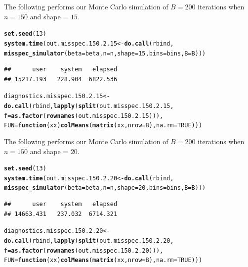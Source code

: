 \documentclass[11pt]{article}\usepackage[]{graphicx}\usepackage[]{color}
\makeatletter
\newcommand{\hlnum}[1]{\textcolor[rgb]{0.686,0.059,0.569}{#1}}%
\newcommand{\hlstd}[1]{\textcolor[rgb]{0.345,0.345,0.345}{#1}}%
\newcommand{\hlkwa}[1]{\textcolor[rgb]{0.161,0.373,0.58}{\textbf{#1}}}%
\newcommand{\hlkwb}[1]{\textcolor[rgb]{0.69,0.353,0.396}{#1}}%
\newcommand{\hlkwc}[1]{\textcolor[rgb]{0.333,0.667,0.333}{#1}}%
\newcommand{\hlkwd}[1]{\textcolor[rgb]{0.737,0.353,0.396}{\textbf{#1}}}%
\newenvironment{kframe}{%
 \def\at@end@of@kframe{}%
 \ifinner\ifhmode%
  \def\at@end@of@kframe{\end{minipage}}%
  \begin{minipage}{\columnwidth}%
 \fi\fi%
 \def\FrameCommand##1{\hskip\@totalleftmargin \hskip-\fboxsep
 \colorbox{shadecolor}{##1}\hskip-\fboxsep
     \hskip-\linewidth \hskip-\@totalleftmargin \hskip\columnwidth}%
 \MakeFramed {\advance\hsize-\width
   \@totalleftmargin\z@ \linewidth\hsize
   \@setminipage}}%
 {\par\unskip\endMakeFramed%
 \at@end@of@kframe}
\newenvironment{knitrout}{}{} %
\makeatother
\begin{document}
The following performs our Monte Carlo simulation of $B = 200$ iterations 
when $n = 150$ and shape = $15$.

\begin{knitrout}
\color{fgcolor}\begin{kframe}
\begin{alltt}
\hlkwd{set.seed}\hlstd{(}\hlnum{13}\hlstd{)}
\hlkwd{system.time}\hlstd{(out.misspec.150.2.15} \hlkwb{<-} \hlkwd{do.call}\hlstd{(rbind,}
  \hlkwd{misspec_simulator}\hlstd{(}\hlkwc{beta} \hlstd{= beta,} \hlkwc{n} \hlstd{= n,} \hlkwc{shape} \hlstd{=} \hlnum{15}\hlstd{,} \hlkwc{bins} \hlstd{= bins,} \hlkwc{B} \hlstd{= B)))}
\end{alltt}
\begin{verbatim}
##      user    system   elapsed 
## 15217.193   228.904  6822.536
\end{verbatim}
\begin{alltt}
\hlstd{diagnostics.misspec.150.2.15} \hlkwb{<-} \hlkwd{do.call}\hlstd{(rbind,} \hlkwd{lapply}\hlstd{(}\hlkwd{split}\hlstd{(out.misspec.150.2.15,}
  \hlkwc{f} \hlstd{=} \hlkwd{as.factor}\hlstd{(}\hlkwd{rownames}\hlstd{(out.misspec.150.2.15))),}
  \hlkwc{FUN} \hlstd{=} \hlkwa{function}\hlstd{(}\hlkwc{xx}\hlstd{)} \hlkwd{colMeans}\hlstd{(}\hlkwd{matrix}\hlstd{(xx,} \hlkwc{nrow} \hlstd{= B),} \hlkwc{na.rm} \hlstd{=} \hlnum{TRUE}\hlstd{)))}
\end{alltt}
\end{kframe}
\end{knitrout}


The following performs our Monte Carlo simulation of $B = 200$ iterations 
when $n = 150$ and shape = $20$.

\begin{knitrout}
\color{fgcolor}\begin{kframe}
\begin{alltt}
\hlkwd{set.seed}\hlstd{(}\hlnum{13}\hlstd{)}
\hlkwd{system.time}\hlstd{(out.misspec.150.2.20} \hlkwb{<-} \hlkwd{do.call}\hlstd{(rbind,}
  \hlkwd{misspec_simulator}\hlstd{(}\hlkwc{beta} \hlstd{= beta,} \hlkwc{n} \hlstd{= n,} \hlkwc{shape} \hlstd{=} \hlnum{20}\hlstd{,} \hlkwc{bins} \hlstd{= bins,} \hlkwc{B} \hlstd{= B)))}
\end{alltt}
\begin{verbatim}
##      user    system   elapsed 
## 14663.431   237.032  6714.321
\end{verbatim}
\begin{alltt}
\hlstd{diagnostics.misspec.150.2.20} \hlkwb{<-} \hlkwd{do.call}\hlstd{(rbind,} \hlkwd{lapply}\hlstd{(}\hlkwd{split}\hlstd{(out.misspec.150.2.20,}
  \hlkwc{f} \hlstd{=} \hlkwd{as.factor}\hlstd{(}\hlkwd{rownames}\hlstd{(out.misspec.150.2.20))),}
  \hlkwc{FUN} \hlstd{=} \hlkwa{function}\hlstd{(}\hlkwc{xx}\hlstd{)} \hlkwd{colMeans}\hlstd{(}\hlkwd{matrix}\hlstd{(xx,} \hlkwc{nrow} \hlstd{= B),} \hlkwc{na.rm} \hlstd{=} \hlnum{TRUE}\hlstd{)))}
\end{alltt}
\end{kframe}
\end{knitrout}
\end{document}
